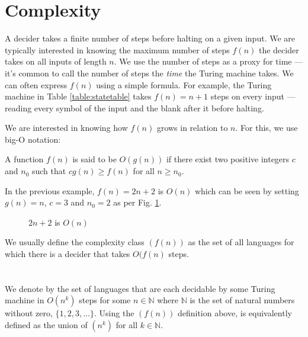\section{Complexity}
  A decider takes a finite number of steps before halting on a given input.
  We are typically interested in knowing the maximum number of steps \( f(n) \) the decider takes on all inputs of length \( n \).
  We use the number of steps as a proxy for time --- it's common to call the number of steps the \emph{time} the Turing machine takes.
  We can often express \( f(n) \) using a simple formula.
  For example, the Turing machine in Table \ref{table:statetable} takes \( f(n) = n + 1 \) steps on every input --- reading every symbol of the input and the blank after it before halting.
  
  We are interested in knowing how \( f(n) \) grows in relation to \( n \).
  For this, we use big-O notation:
  \begin{definition}
    A function \( f(n) \) is said to be \( O(g(n)) \) if there exist two positive integers \( c \) and \( n_0 \) such that \( cg(n) \geq f(n) \) for all \(n \geq n_0 \).
  \end{definition}
  In the previous example, \( f(n) = 2n + 2 \) is \( O(n) \) which can be seen by setting \( g(n) = n \), \( c = 3 \) and \( n_0 = 2 \) as per Fig. \ref{plot:2n2}.
  \begin{figure}[H]
  \caption{\( 2n + 2 \) is \( O(n) \)}
  \label{plot:2n2}
  \end{figure}
  We usually define the complexity class \((f(n)) \) as the set of all languages for which there is a decider that takes \( O(f(n) \) steps.

\section{}
  We denote by  the set of languages that are each decidable by some Turing machine in \( O(n^k) \) steps for some \( n \in \mathbb{N} \) where \( \mathbb{N} \) is the set of natural numbers without zero, \( \{ 1, 2, 3, \ldots\} \).
  Using the \((f(n)) \) definition above,  is equivalently defined as the union of \((n^k)\) for all \( k \in \mathbb{N} \).
  
